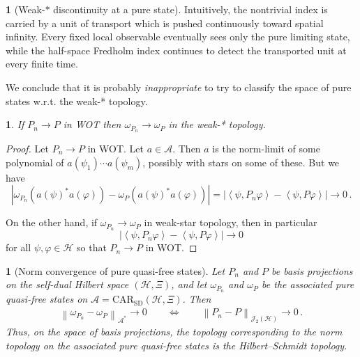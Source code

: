\documentclass[a4paper,10pt]{article}
\numberwithin{equation}{section}
\theoremstyle{plain}
\theoremstyle{plain}
\newtheorem{lem}[lem]{\protect\lemmaname}
\theoremstyle{plain}
\theoremstyle{plain}
\theoremstyle{plain}
\newtheorem{claim}[claim]{\protect\claimname}
\theoremstyle{remark}
\theoremstyle{definition}
\newtheorem{example}[example]{\protect\examplename}
\providecommand{\claimname}{Claim}
\providecommand{\lemmaname}{Lemma}
\providecommand{\examplename}{Example}
\newcommand{\calA}{\mathcal{A}}
\newcommand{\calH}{\mathcal{H}}
\newcommand{\calJ}{\mathcal{J}}
\newcommand\norm[1]{\left\lVert#1\right\rVert}
\newcommand{\eql}[1]{\begin{align}#1\end{align}}
\begin{document}
\begin{example}[Weak-$*$ discontinuity at a pure state]
Intuitively, the nontrivial index is carried by a unit of transport which is
pushed continuously toward spatial infinity. Every fixed local observable
eventually sees only the pure limiting state, while the half-space Fredholm
index continues to detect the transported unit at every finite time.
\end{example}



We conclude that it is probably \emph{inappropriate }to try to classify
the space of pure states w.r.t. the weak-* topology.
\begin{claim}
If $P_{n}\to P$ in WOT then $\omega_{P_{n}}\to\omega_{P}$ in the
weak-* topology.
\end{claim}

\begin{proof}
Let $P_{n}\to P$ in WOT. Let $a\in\mathcal{A}$. Then $a$ is the
norm-limit of some polynomial of $a\left(\psi_{1}\right)\cdots a\left(\psi_{m}\right)$,
possibly with stars on some of these. But we have
\[
\left|\omega_{P_{n}}\left(a\left(\psi\right)^{\ast}a\left(\varphi\right)\right)-\omega_{P}\left(a\left(\psi\right)^{\ast}a\left(\varphi\right)\right)\right|=\left|\left\langle \psi,P_{n}\varphi\right\rangle -\left\langle \psi,P\varphi\right\rangle \right|\to0\,.
\]

On the other hand, if $\omega_{P_{n}}\to\omega_{P}$ in weak-star
topology, then in particular 
\[
\left|\left\langle \psi,P_{n}\varphi\right\rangle -\left\langle \psi,P\varphi\right\rangle \right|\to0
\]
for all $\psi,\varphi\in\mathcal{H}$ so that $P_{n}\to P$ in WOT.
\end{proof}
%
\begin{lem}[Norm convergence of pure quasi-free states]\label{lem:HS-topology-qf-norm-convergence}
Let $P_n$ and $P$ be basis projections on the self-dual Hilbert space
$(\calH,\Xi)$, and let $\omega_{P_n}$ and $\omega_P$ be the associated pure
quasi-free states on $\calA=\mathrm{CAR}_{\mathrm{SD}}(\calH,\Xi)$. Then
\eql{\label{eq:HS-topology-qf-norm-convergence}
\norm{\omega_{P_n}-\omega_P}_{\calA^*}\longrightarrow 0
\qquad\Longleftrightarrow\qquad
\norm{P_n-P}_{\calJ_2(\calH)}\longrightarrow 0\,.
}
Thus, on the space of basis projections, the topology corresponding to the norm
topology on the associated pure quasi-free states is the Hilbert--Schmidt
topology.
\end{lem}
\end{document}

